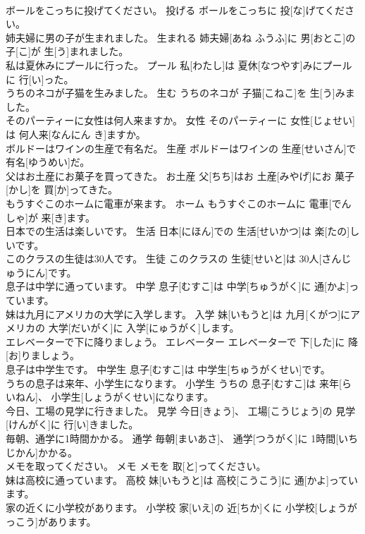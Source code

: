 \documentclass[8pt]{extreport}
\begin{document}
\begin{CJK}{UTF8}{min}
\\	ボールをこっちに投げてください。	投げる	ボールをこっちに 投[な]げてください。	
\\	姉夫婦に男の子が生まれました。	生まれる	姉夫婦[あね ふうふ]に 男[おとこ]の 子[こ]が 生[う]まれました。	
\\	私は夏休みにプールに行った。	プール	私[わたし]は 夏休[なつやす]みにプールに 行[い]った。	
\\	うちのネコが子猫を生みました。	生む	うちのネコが 子猫[こねこ]を 生[う]みました。	
\\	そのパーティーに女性は何人来ますか。	女性	そのパーティーに 女性[じょせい]は 何人来[なんにん き]ますか。	
\\	ボルドーはワインの生産で有名だ。	生産	ボルドーはワインの 生産[せいさん]で 有名[ゆうめい]だ。	
\\	父はお土産にお菓子を買ってきた。	お土産	父[ちち]はお 土産[みやげ]にお 菓子[かし]を 買[か]ってきた。	
\\	もうすぐこのホームに電車が来ます。	ホーム	もうすぐこのホームに 電車[でんしゃ]が 来[き]ます。	
\\	日本での生活は楽しいです。	生活	日本[にほん]での 生活[せいかつ]は 楽[たの]しいです。	
\\	このクラスの生徒は30人です。	生徒	このクラスの 生徒[せいと]は 30人[さんじゅうにん]です。	
\\	息子は中学に通っています。	中学	息子[むすこ]は 中学[ちゅうがく]に 通[かよ]っています。	
\\	妹は九月にアメリカの大学に入学します。	入学	妹[いもうと]は 九月[くがつ]にアメリカの 大学[だいがく]に 入学[にゅうがく]します。	
\\	エレベーターで下に降りましょう。	エレベーター	エレベーターで 下[した]に 降[お]りましょう。	
\\	息子は中学生です。	中学生	息子[むすこ]は 中学生[ちゅうがくせい]です。	
\\	うちの息子は来年、小学生になります。	小学生	うちの 息子[むすこ]は 来年[らいねん]、 小学生[しょうがくせい]になります。	
\\	今日、工場の見学に行きました。	見学	今日[きょう]、 工場[こうじょう]の 見学[けんがく]に 行[い]きました。	
\\	毎朝、通学に1時間かかる。	通学	毎朝[まいあさ]、 通学[つうがく]に 1時間[いちじかん]かかる。	
\\	メモを取ってください。	メモ	メモを 取[と]ってください。	
\\	妹は高校に通っています。	高校	妹[いもうと]は 高校[こうこう]に 通[かよ]っています。	
\\	家の近くに小学校があります。	小学校	家[いえ]の 近[ちか]くに 小学校[しょうがっこう]があります。	

\end{CJK}
\end{document}

